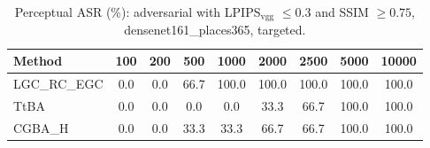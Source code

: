 \begin{table}[t]
\centering\footnotesize
\caption{Perceptual ASR (\%): adversarial with LPIPS$_{\mathrm{vgg}}$ $\le 0.3$ and SSIM $\ge 0.75$, densenet161\_places365, targeted.}
\begin{tabular}{lcccccccc}
\toprule
Method & 100 & 200 & 500 & 1000 & 2000 & 2500 & 5000 & 10000 \\
\midrule
LGC\_RC\_EGC & 0.0 & 0.0 & 66.7 & 100.0 & 100.0 & 100.0 & 100.0 & 100.0 \\
TtBA & 0.0 & 0.0 & 0.0 & 0.0 & 33.3 & 66.7 & 100.0 & 100.0 \\
CGBA\_H & 0.0 & 0.0 & 33.3 & 33.3 & 66.7 & 66.7 & 100.0 & 100.0 \\
\bottomrule
\end{tabular}
\end{table}

